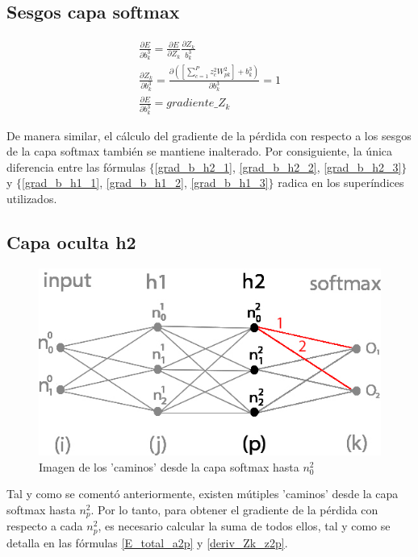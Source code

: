 \subsection{Sesgos capa softmax}

\begin{gather}
	\frac{\partial E}{\partial b^3_k} = \frac{\partial E}{\partial Z_k}   \frac{\partial Z_k}{b^3_k} \label{grad_b_h2_1} \\
	\frac{\partial Z_k }{\partial b^3_k } = \frac{\partial ([\sum_{c=1}^{P} z^2_c   W^2_{pk}] + b^3_k) }{\partial b^3_k } = 1 \label{grad_b_h2_2} \\
	\frac{\partial E}{\partial b^3_k} = gradiente\_Z_k \label{grad_b_h2_3}
\end{gather}

De manera similar, el cálculo del gradiente de la pérdida con respecto a los sesgos de la capa softmax también se mantiene inalterado. Por consiguiente, la única diferencia entre las fórmulas $\{$\ref{grad_b_h2_1}, \ref{grad_b_h2_2}, \ref{grad_b_h2_3}$\}$ y $\{$\ref{grad_b_h1_1}, \ref{grad_b_h1_2}, \ref{grad_b_h1_3}$\}$ radica en los superíndices utilizados.

\subsection{Capa oculta h2}

\begin{figure}[H]
	\centering
	\includegraphics[scale=0.35]{imagenes/nn_h2_caminos_posibles.jpg}  
	\caption{Imagen de los 'caminos' desde la capa softmax hasta $n^2_0$}
	\label{nn_h2_caminos_posibles}
\end{figure}

Tal y como se comentó anteriormente, existen mútiples 'caminos' desde la capa softmax hasta $n^2_p$. Por lo tanto, para obtener el gradiente de la pérdida con respecto a cada $n^2_p$, es necesario calcular la suma de todos ellos, tal y como se detalla en las fórmulas \ref{E_total_a2p} y \ref{deriv_Zk_z2p}. \\


